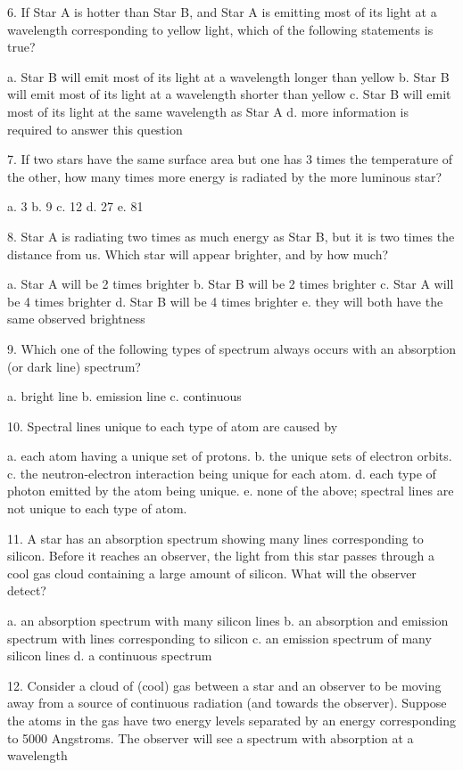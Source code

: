 6. If Star A is hotter than Star B, and Star A is emitting most of its light at a wavelength
corresponding to yellow light, which of the following statements is true?

a. Star B will emit most of its light at a wavelength longer than yellow
b. Star B will emit most of its light at a wavelength shorter than yellow
c. Star B will emit most of its light at the same wavelength as Star A
d. more information is required to answer this question

7. If two stars have the same surface area but one has 3 times the temperature of the other,
how many times more energy is radiated by the more luminous star?

a. 3
b. 9
c. 12
d. 27
e. 81

8. Star A is radiating two times as much energy as Star B, but it is two times the distance
from us. Which star will appear brighter, and by how much?

a. Star A will be 2 times brighter
b. Star B will be 2 times brighter
c. Star A will be 4 times brighter
d. Star B will be 4 times brighter
e. they will both have the same observed brightness

9. Which one of the following types of spectrum always occurs with an
absorption (or dark line) spectrum?

a. bright line
b. emission line
c. continuous

10. Spectral lines unique to each type of atom are caused by

a. each atom having a unique set of protons.
b. the unique sets of electron orbits.
c. the neutron-electron interaction being unique for each atom.
d. each type of photon emitted by the atom being unique.
e. none of the above; spectral lines are not unique to each type of atom.

11. A star has an absorption spectrum showing many lines corresponding to silicon.
Before it reaches an observer, the light from this star passes through a cool gas cloud
containing a large amount of silicon. What will the observer detect?

a. an absorption spectrum with many silicon lines
b. an absorption and emission spectrum with lines corresponding to silicon
c. an emission spectrum of many silicon lines
d. a continuous spectrum

12. Consider a cloud of (cool) gas between a star and an observer to be moving away
from a source of continuous radiation (and towards the observer). Suppose the atoms
in the gas have two energy levels separated by an energy corresponding to 5000 Angstroms.
The observer will see a spectrum with absorption at a wavelength

